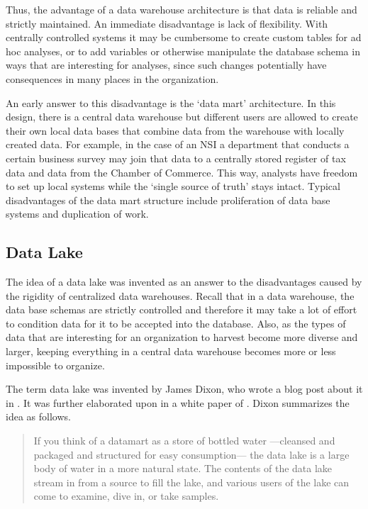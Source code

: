 Thus, the advantage of a data warehouse architecture is that data is reliable
and strictly maintained. An immediate disadvantage is lack of flexibility.
With centrally controlled systems it may be cumbersome to create custom tables
for ad hoc analyses, or to add variables or otherwise manipulate the database
schema in ways that are interesting for analyses, since such changes
potentially have consequences in many places in the organization. 

An early answer to this disadvantage is the `data mart' architecture. In this
design, there is a central data warehouse but different users are allowed to
create their own local data bases that combine data from the warehouse with
locally created data. For example, in the case of an NSI a department that
conducts a certain business survey may join that data to a centrally stored
register of tax data and data from the Chamber of Commerce. This way, analysts
have freedom to set up local systems while the `single source of truth' stays
intact. Typical disadvantages of the data mart structure include proliferation
of data base systems and duplication of work.


\subsection{Data Lake}
The idea of a data lake was invented as an answer to the disadvantages caused
by the rigidity of centralized data warehouses. Recall that in a data
warehouse, the data base schemas are strictly controlled and therefore it may
take a lot of effort to condition data for it to be accepted into the database.
Also, as the types of data that are interesting for an organization to harvest
become more diverse and larger, keeping everything in a central data warehouse
becomes more or less impossible to organize.

The term data lake was invented by James Dixon, who wrote a blog post about it
in
.
It was further elaborated upon in a white paper of \citet{stein2014enterprise}. Dixon
summarizes the idea as follows.
\begin{quote}
If you think of a datamart as a store of bottled water ---cleansed and packaged and
structured for easy consumption--- the data lake is a large body of water in a more
natural state. The contents of the data lake stream in from a source to fill the lake,
and various users of the lake can come to examine, dive in, or take samples.
\end{quote}

